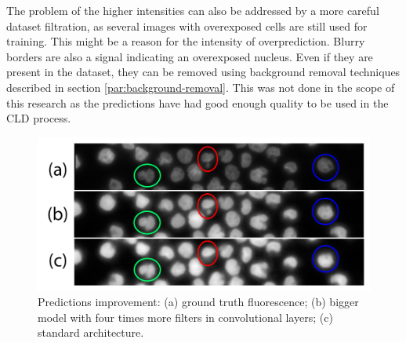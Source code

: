 The problem of the higher intensities can also be addressed by a more careful dataset filtration, as several images with overexposed cells are still used for training. This might be a reason for the intensity of overprediction. Blurry borders are also a signal indicating an overexposed nucleus. Even if they are present in the dataset, they can be removed using background removal techniques described in section \ref{par:background-removal}. This was not done in the scope of this research as the predictions have had good enough quality to be used in the CLD process.

\begin{figure}[H]
	\begin{center}
		\includegraphics[width=0.6\linewidth]{bilder/nuclei/bigger-model.png}
		\caption{Predictions improvement: (a) ground truth fluorescence; (b) bigger model with four times more filters in convolutional layers; (c) standard architecture.}\label{fig:better-nuclei}
	\end{center}
\end{figure}
